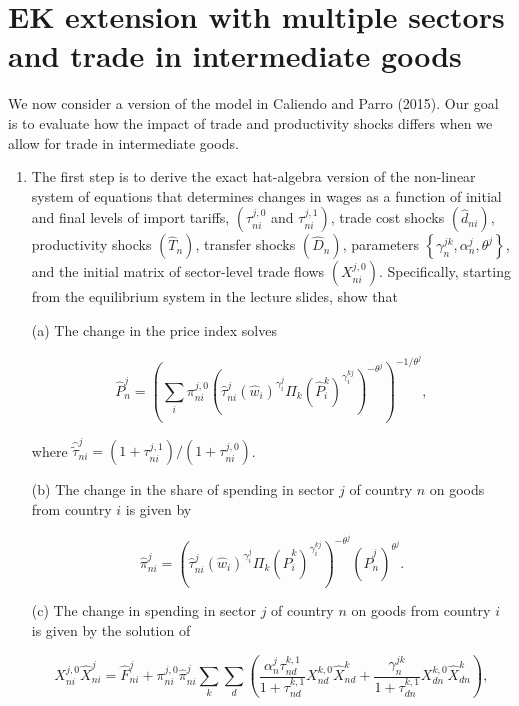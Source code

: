 \documentclass[12pt,oneside,reqno]{article}
\begin{document}
\section{EK extension with multiple sectors and trade in intermediate goods}

We now consider a version of the model in Caliendo and Parro (2015). Our goal is to evaluate how the impact of trade and productivity shocks differs when we allow for trade in intermediate goods.
\begin{enumerate}
    \item The first step is to derive the exact hat-algebra version of the non-linear system of equations that determines changes in wages as a function of initial and final levels of import tariffs, $\left(\tau_{n i}^{j, 0}\right.$ and $\left.\tau_{n i}^{j, 1}\right)$, trade cost shocks $\left(\hat{d}_{n i}\right)$, productivity shocks $\left(\hat{T}_{n}\right)$, transfer shocks $\left(\hat{D}_{n}\right)$, parameters $\left\{\gamma_{n}^{j k}, \alpha_{n}^{j}, \theta^{j}\right\}$, and the initial matrix of sector-level trade flows $\left(X_{n i}^{j, 0}\right)$. Specifically, starting from the equilibrium system in the lecture slides, show that

(a) The change in the price index solves

\begin{equation*}
\hat{P}_{n}^{j}=\left(\sum_{i} \pi_{n i}^{j, 0}\left(\hat{\tau}_{n i}^{j}\left(\hat{w}_{i}\right)^{\gamma_{i}^{j}} \Pi_{k}\left(\hat{P}_{i}^{k}\right)^{\gamma_{i}^{k j}}\right)^{-\theta^{j}}\right)^{-1 / \theta^{j}},
\end{equation*}

where $\hat{\tilde{\tau}}_{n i}^{j}=\left(1+\tau_{n i}^{j, 1}\right) /\left(1+\tau_{n i}^{j, 0}\right)$.

(b) The change in the share of spending in sector $j$ of country $n$ on goods from country $i$ is given by

\begin{equation*}
\hat{\pi}_{n i}^{j}=\left(\hat{\tau}_{n i}^{j}\left(\hat{w}_{i}\right)^{\gamma_{i}^{j}} \Pi_{k}\left(\hat{P}_{i}^{k}\right)^{\gamma_{i}^{k j}}\right)^{-\theta^{j}}\left(\hat{P}_{n}^{j}\right)^{\theta^{j}} .
\end{equation*}

(c) The change in spending in sector $j$ of country $n$ on goods from country $i$ is given by the solution of

\begin{equation*}
X_{n i}^{j, 0} \hat{X}_{n i}^{j}=\hat{F}_{n i}^{j}+\pi_{n i}^{j, 0} \hat{\pi}_{n i}^{j} \sum_{k} \sum_{d}\left(\frac{\alpha_{n}^{j} \tau_{n d}^{k, 1}}{1+\tau_{n d}^{k, 1}} X_{n d}^{k, 0} \hat{X}_{n d}^{k}+\frac{\gamma_{n}^{j k}}{1+\tau_{d n}^{k, 1}} X_{d n}^{k, 0} \hat{X}_{d n}^{k}\right),
\end{equation*}


\end{enumerate}
\end{document}
